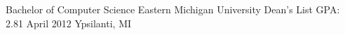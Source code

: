 Bachelor of Computer Science
Eastern Michigan University
Dean's List
GPA: 2.81
April 2012
Ypsilanti, MI
